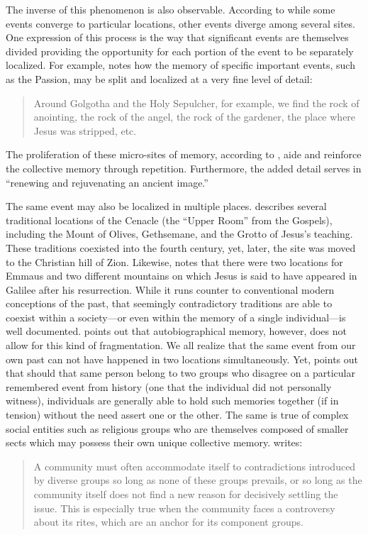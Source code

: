 The inverse of this phenomenon is also observable. According to \halbwachs while some events converge to particular locations, other events diverge among several sites. One expression of this process is the way that significant events are themselves divided providing the opportunity for each portion of the event to be separately localized. For example, \halbwachs notes how the memory of specific important events, such as the Passion, may be split and localized at a very fine level of detail:  

\begin{quote} Around Golgotha and the Holy Sepulcher, for example, we find the rock of anointing, the rock of the angel, the rock of the gardener, the place where Jesus was stripped, etc.\autocite[220]{halbwachs1992} \end{quote}  

The proliferation of these micro-sites of memory, according to \halbwachs, aide and reinforce the collective memory through repetition. Furthermore, the added detail serves in ``renewing and rejuvenating an ancient image.''\autocite[220]{halbwachs1992}  

The same event may also be localized in multiple places. \halbwachs describes several traditional locations of the Cenacle (the ``Upper Room'' from the Gospels), including the Mount of Olives, Gethsemane, and the Grotto of Jesus's teaching. These traditions coexisted into the fourth century, yet, later, the site was moved to the Christian hill of Zion. Likewise, \halbwachs notes that there were two locations for Emmaus and two different mountains on which Jesus is said to have appeared in Galilee after his resurrection. While it runs counter to conventional modern conceptions of the past, that seemingly contradictory traditions are able to coexist within a society---or even within the memory of a single individual---is well documented.
\halbwachs points out that autobiographical memory, however, does not allow for this kind of fragmentation.
%
We all realize that the same event from our own past can not have happened in two locations simultaneously. Yet, \halbwachs points out that should that same person belong to two groups who disagree on a particular remembered event from history (one that the individual did not personally witness), individuals are generally able to hold such memories together (if in tension) without the need assert one or the other. The same is true of complex social entities such as religious groups who are themselves composed of smaller sects which may possess their own unique collective memory. \halbwachs writes:  

\begin{quote} A community must often accommodate itself to contradictions introduced by diverse groups so long as none of these groups prevails, or so long as the community itself does not find a new reason for decisively settling the issue. This is especially true when the community faces a controversy about its rites, which are an anchor for its component groups.\autocite[224]{halbwachs1992} \end{quote} 

